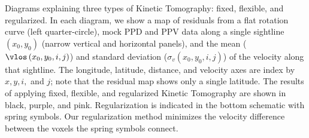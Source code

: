 \label{fig:diagram} Diagrams explaining three types of Kinetic Tomography: fixed, flexible, and regularized. In each diagram, we show a map of residuals from a flat rotation curve (left quarter-circle), mock PPD and PPV data along a single sightline $\left(x_0, y_0\right)$ (narrow vertical and horizontal panels), and the mean ($\vlos\left(x_0, y_0, i, j\right)$) and standard deviation ($\sigma_v\left(x_0, y_0, i, j\right)$) of the velocity along that sightline. The longitude, latitude, distance, and velocity axes are index by $x, y, i,$ and $j$; note that the residual map shows only a single latitude. The results of applying fixed, flexible, and regularized Kinetic Tomography are shown in black, purple, and pink. Regularization is indicated in the bottom schematic with spring symbols. Our regularization method minimizes the velocity difference between the voxels the spring symbols connect. 